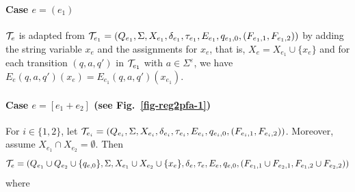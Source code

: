 		
\paragraph{Case $e = (e_1)$} $\mathcal{T}_e$ is adapted from $\mathcal{T}_{e_1} = (Q_{e_1}, \Sigma, X_{e_1}, \delta_{e_1}, \tau_{e_1}, E_{e_1},  q_{e_1,0}, (F_{e_1,1}, F_{e_1,2}))$ by adding the string variable $x_e$ and the assignments for $x_e$, that is, $X_e = X_{e_1} \cup \{x_e\}$ and for each transition $(q, a, q')$ in $\mathcal{T}_{e_1} $ with $a \in \Sigma^\varepsilon$, we have $E_e(q, a, q')(x_e) = E_{e_1}(q, a, q')(x_{e_1})$. 
		

\paragraph{Case $e = [e_1 + e_2]$ (see Fig.~\ref{fig-reg2pfa-1})} For $i \in \{1, 2\}$, 
let $\mathcal{T}_{e_i} = (Q_{e_i}, \Sigma, X_{e_i}, \delta_{e_i}, \tau_{e_i}, E_{e_i},  q_{e_i,0}, (F_{e_i,1}, F_{e_i,2}))$. Moreover, assume $X_{e_1} \cap X_{e_2} = \emptyset$.
% 
Then 
\[\mathcal{T}_e = (Q_{e_1} \cup Q_{e_2} \cup \{q_{e,0}\}, \Sigma, X_{e_1} \cup X_{e_2} \cup \{x_e\}, 
		\delta_e, \tau_e, E_e, q_{e,0}, (F_{e_1,1} \cup F_{e_2,1}, F_{e_1,2} \cup F_{e_2,2}))\] where  
